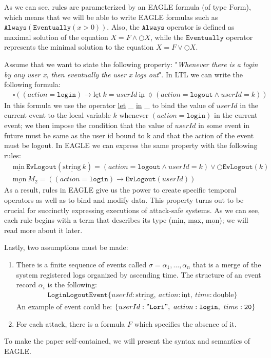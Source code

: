 \documentclass[english]{article}
\begin{document}
As we can see, rules are parameterized by an EAGLE formula (of type $\underline{\text{Form}}$), which means that we will be able to write EAGLE formulas such as $\mathtt{Always}(\mathtt{Eventually}(x>0))$. Also, the $\mathtt{Always}$ operator is defined as maximal solution of the equation $X=F\land \bigcirc X$, while the $\mathtt{Eventually}$ operator represents the minimal solution to the equation $X=F\lor \bigcirc X$.

Assume that we want to state the following property: "\textit{Whenever there is a login by any user x, then eventually the user x logs out}". In LTL we can write the following formula: 
\begin{align*}
    & \square{((action = \mathtt{login})\rightarrow \underline{\text{let}}\ k=userId\ \underline{\text{in}}\ \lozenge(action = \mathtt{logout}\land userId = k))}
\end{align*}
In this formula we use the operator \underline{let} \_ \underline{in} \_ to bind the value of $userId$ in the current event to the local variable $k$ whenever $(action = \mathtt{login})$ in the current event; we then impose the condition that the value of $userId$ in some event in future must be same as the user id bound to k and that the action of the event must be logout.
In EAGLE we can express the same property with the following rules:
\begin{align*}
    & \underline{\text{min}}\ \mathtt{EvLogout}(\underline{\text{string}}\ k) = (action = \mathtt{logout}\land userId = k) \lor \bigcirc \mathtt{EvLogout}(k) \\
    & \underline{\text{mon}}\ M_2 = ((action = \mathtt{login})\rightarrow \mathtt{EvLogout}(userId)) 
\end{align*}
As a result, rules in EAGLE give us the power to create specific temporal operators as well as to bind and modify data. This property turns out to be crucial for succinctly expressing executions of attack-safe systems. As we can see, each rule begins with a term that describes its type ($\underline{\text{min}}$, $\underline{\text{max}}$, $\underline{\text{mon}}$); we will read more about it later.

Lastly, two assumptions must be made:\begin{enumerate}
    \item There is a finite sequence of events called $\sigma=\alpha_{1},\ldots ,\alpha_{n}$ that is a merge of the system registered logs organized by ascending time. 
    The structure of an event record $\alpha_i$ is the following:
    \begin{align*}
        & \mathtt{LoginLogoutEvent}\{userId:\underline{\text{string}},\ action: \underline{\text{int}},\ time: \underline{\text{double}}\} 
    \end{align*}
    An example of event could be: $\{userId:\mathtt{"Lori"},\ action:\mathtt{login},\ time:\mathtt{20}\}$
    \item For each attack, there is a formula $F$ which specifies the absence of it.
\end{enumerate}
To make the paper self-contained, we will present the syntax and semantics of EAGLE.
\end{document}
